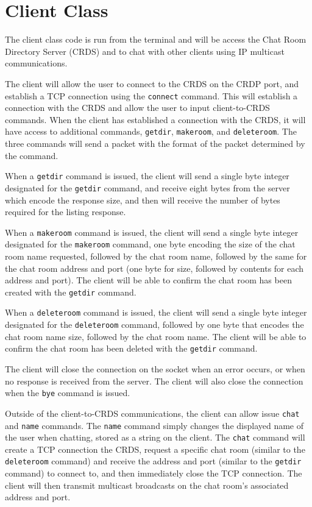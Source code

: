 \section*{Client Class}
The client class code is run from the terminal and will be access the Chat Room Directory Server (CRDS) and to chat with other clients using IP multicast communications.

The client will allow the user to connect to the CRDS on the CRDP port, and establish a TCP connection using the \texttt{connect} command. This will establish a connection with the CRDS and allow the user to input client-to-CRDS commands. When the client has established a connection with the CRDS, it will have access to additional commands, \texttt{getdir}, \texttt{makeroom}, and \texttt{deleteroom}. The three commands will send a packet with the format of the packet determined by the command.

When a \texttt{getdir} command is issued, the client will send a single byte integer designated for the \texttt{getdir} command, and receive eight bytes from the server which encode the response size, and then will receive the number of bytes required for the listing response.

When a \texttt{makeroom} command is issued, the client will send a single byte integer designated for the \texttt{makeroom} command, one byte encoding the size of the chat room name requested, followed by the chat room name, followed by the same for the chat room address and port (one byte for size, followed by contents for each address and port). The client will be able to confirm the chat room has been created with the \texttt{getdir} command.

When a \texttt{deleteroom} command is issued, the client will send a single byte integer designated for the \texttt{deleteroom} command, followed by one byte that encodes the chat room name size, followed by the chat room name. The client will be able to confirm the chat room has been deleted with the \texttt{getdir} command.

The client will close the connection on the socket when an error occurs, or when no response is received from the server. The client will also close the connection when the \texttt{bye} command is issued.

Outside of the client-to-CRDS communications, the client can allow issue \texttt{chat} and \texttt{name} commands. The \texttt{name} command simply changes the displayed name of the user when chatting, stored as a string on the client. The \texttt{chat} command will create a TCP connection the CRDS, request a specific chat room (similar to the \texttt{deleteroom} command) and receive the address and port (similar to the \texttt{getdir} command) to connect to, and then immediately close the TCP connection. The client will then transmit multicast broadcasts on the chat room's associated address and port.
